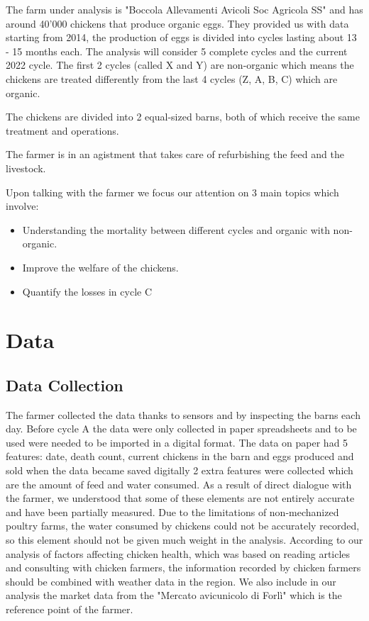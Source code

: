 \documentclass[11pt]{article}
\begin{document}
The farm under analysis is "Boccola Allevamenti Avicoli Soc Agricola SS" and has around 40'000 chickens that produce organic eggs. They provided us with data starting from 2014, the production of eggs is divided into cycles lasting about 13 - 15 months each. The analysis will consider 5 complete cycles and the current 2022 cycle. The first 2 cycles (called X and Y) are non-organic which means the chickens are treated differently from the last 4 cycles (Z, A, B, C) which are organic.

The chickens are divided into 2 equal-sized barns, both of which receive the same treatment and operations.

The farmer is in an agistment that takes care of refurbishing the feed and the livestock.

Upon talking with the farmer we focus our attention on 3 main topics which involve:
\begin{itemize}
    \item Understanding the mortality between different cycles and organic with non-organic.
    \item Improve the welfare of the chickens.
    \item Quantify the losses in cycle C
\end{itemize}

\section{Data}
\subsection{Data Collection}
The farmer collected the data thanks to sensors and by inspecting the barns each day. Before cycle A the data were only collected in paper spreadsheets and to be used were needed to be imported in a digital format.
The data on paper had 5 features: date, death count, current chickens in the barn and eggs produced and sold
when the data became saved digitally 2 extra features were collected which are the amount of feed and water consumed. 
As a result of direct dialogue with the farmer, we understood that some of these elements are not entirely accurate and have been partially measured. Due to the limitations of non-mechanized poultry farms, the water consumed by chickens could not be accurately recorded, so this element should not be given much weight in the analysis.
According to our analysis of factors affecting chicken health, which was based on reading articles and consulting with chicken farmers, the information recorded by chicken farmers should be combined with weather data in the region.
We also include in our analysis the market data from the "Mercato avicunicolo di Forlì" which is the reference point of the farmer.
\end{document}
